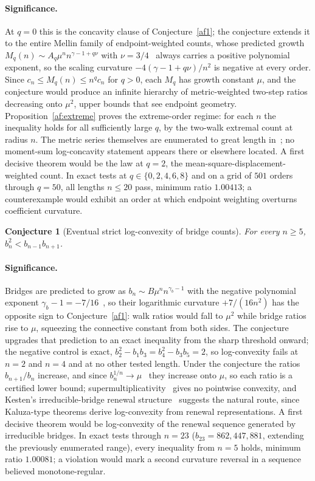 \documentclass[11pt]{article}
\newtheorem{conjecture}{Conjecture}
\theoremstyle{definition}
\begin{document}
\paragraph{Significance.}
At $q=0$ this is the concavity clause of Conjecture~\ref{af1}; the conjecture extends it to the entire Mellin family of endpoint-weighted counts, whose predicted growth $M_q(n)\sim A_q\mu^nn^{\gamma-1+q\nu}$ with $\nu=3/4$~\cite{Nie82} always carries a positive polynomial exponent, so the scaling curvature $-4(\gamma-1+q\nu)/n^2$ is negative at every order.  Since $c_n\le M_q(n)\le n^qc_n$ for $q>0$, each $M_q$ has growth constant $\mu$, and the conjecture would produce an infinite hierarchy of metric-weighted two-step ratios decreasing onto $\mu^2$, upper bounds that see endpoint geometry.  Proposition~\ref{af:extreme} proves the extreme-order regime: for each $n$ the inequality holds for all sufficiently large $q$, by the two-walk extremal count at radius $n$.  The metric series themselves are enumerated to great length in~\cite{Jen13}; no moment-sum log-concavity statement appears there or elsewhere located.  A first decisive theorem would be the law at $q=2$, the mean-square-displacement-weighted count.  In exact tests at $q\in\{0,2,4,6,8\}$ and on a grid of $501$ orders through $q=50$, all lengths $n\le20$ pass, minimum ratio $1.00413$; a counterexample would exhibit an order at which endpoint weighting overturns coefficient curvature.

\begin{conjecture}[Eventual strict log-convexity of bridge counts]\label{af3}
For every $n\ge5$, $b_n^2<b_{n-1}b_{n+1}$.
\end{conjecture}

\paragraph{Significance.}
Bridges are predicted to grow as $b_n\sim B\mu^nn^{\gamma_b-1}$ with the negative polynomial exponent $\gamma_b-1=-7/16$~\cite{DG19}, so their logarithmic curvature $+7/(16n^2)$ has the opposite sign to Conjecture~\ref{af1}: walk ratios would fall to $\mu^2$ while bridge ratios rise to $\mu$, squeezing the connective constant from both sides.  The conjecture upgrades that prediction to an exact inequality from the sharp threshold onward; the negative control is exact, $b_2^2-b_1b_3=b_4^2-b_3b_5=2$, so log-convexity fails at $n=2$ and $n=4$ and at no other tested length.  Under the conjecture the ratios $b_{n+1}/b_n$ increase, and since $b_n^{1/n}\to\mu$~\cite{HW62} they increase onto $\mu$, so each ratio is a certified lower bound; supermultiplicativity~\cite{HW62} gives no pointwise convexity, and Kesten's irreducible-bridge renewal structure~\cite{Kes63} suggests the natural route, since Kaluza-type theorems derive log-convexity from renewal representations.  A first decisive theorem would be log-convexity of the renewal sequence generated by irreducible bridges.  In exact tests through $n=23$ ($b_{23}=862{,}447{,}881$, extending the previously enumerated range), every inequality from $n=5$ holds, minimum ratio $1.00081$; a violation would mark a second curvature reversal in a sequence believed monotone-regular.
\end{document}
